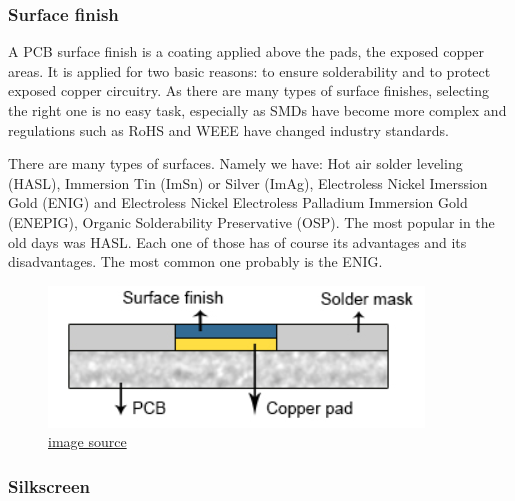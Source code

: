 \documentclass[final]{cubedoc}
\begin{document}
	
	
	
	\subsubsection{Surface finish}
	
	
	A PCB surface finish is a coating applied above the pads, the exposed copper areas. It is applied for two basic reasons: to ensure solderability and to protect exposed copper circuitry. As there are many types of surface finishes, selecting the right one is no easy task, especially as SMDs have become more complex and regulations such as RoHS and WEEE have changed industry standards.
	
	There are many types of surfaces. Namely we have: Hot air solder leveling (HASL), Immersion Tin (ImSn) or Silver (ImAg), Electroless Nickel Imerssion Gold (ENIG) and Electroless Nickel Electroless Palladium Immersion Gold (ENEPIG), Organic Solderability Preservative (OSP). The most popular in the old days was HASL.
	Each one of those has of course its advantages and its disadvantages. The most common one probably is the ENIG.
	
	
	\begin{figure}[h!]
		\centering
		\includegraphics[keepaspectratio, height=0.2\textheight, width=.6\textwidth]{assets/surface_finish.png}
		\caption{\href{https://web.archive.org/web/20200814090855/https://www.pcbcart.com/article/content/surface-finish-intro-and-comparision.html}{image source}}
	\end{figure}
	
	\subsubsection{Silkscreen}
	
\end{document}
